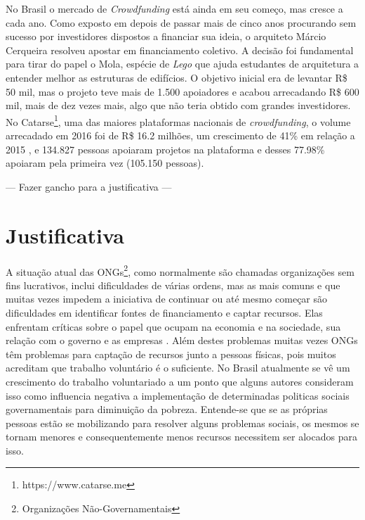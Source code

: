 No Brasil o mercado de \emph{Crowdfunding} está ainda em seu começo, mas cresce a cada ano. Como exposto em  \cite{globo-financiamento} depois de passar mais de cinco anos procurando sem sucesso por investidores dispostos a financiar sua ideia, o arquiteto Márcio Cerqueira resolveu apostar em financiamento coletivo. A decisão foi fundamental para tirar do papel o Mola, espécie de \emph{Lego} que ajuda estudantes de arquitetura a entender melhor as estruturas de edifícios. O objetivo inicial era de levantar R\$ 50 mil, mas o projeto teve mais de 1.500 apoiadores e acabou arrecadando R\$ 600 mil, mais de dez vezes mais, algo que não teria obtido com grandes investidores. No Catarse\footnote{https://www.catarse.me}, uma das maiores plataformas nacionais de \emph{crowdfunding}, o volume arrecadado em 2016 foi de R\$ 16.2 milhões, um crescimento de 41\% em relação a 2015 \cite{catarse-retrospectiva2016}, e 134.827 pessoas apoiaram projetos na plataforma e desses 77.98\% apoiaram pela primeira vez (105.150 pessoas).

--- Fazer gancho para a justificativa ---



\section{Justificativa}
A situação atual das ONGs\footnote{Organizações Não-Governamentais}, como normalmente são chamadas organizações sem fins lucrativos, inclui dificuldades de várias ordens, mas as mais comuns e que muitas vezes impedem a iniciativa de continuar ou até mesmo começar são dificuldades em identificar fontes de financiamento e captar recursos. Elas enfrentam críticas sobre o papel que ocupam na economia e na sociedade, sua relação com o governo e as empresas \cite{GOUVEIA2007}. Além destes problemas muitas vezes ONGs têm problemas para captação de recursos junto a pessoas físicas, pois muitos acreditam que trabalho voluntário é o suficiente. No Brasil atualmente se vê um crescimento do trabalho voluntariado a um ponto que alguns autores \cite{fagundes2012repercussoes} consideram isso como influencia negativa a implementação de determinadas politicas sociais governamentais para diminuição da pobreza. Entende-se que se as próprias pessoas estão se mobilizando para resolver alguns problemas sociais, os mesmos se tornam menores e consequentemente menos recursos necessitem ser alocados para isso.

